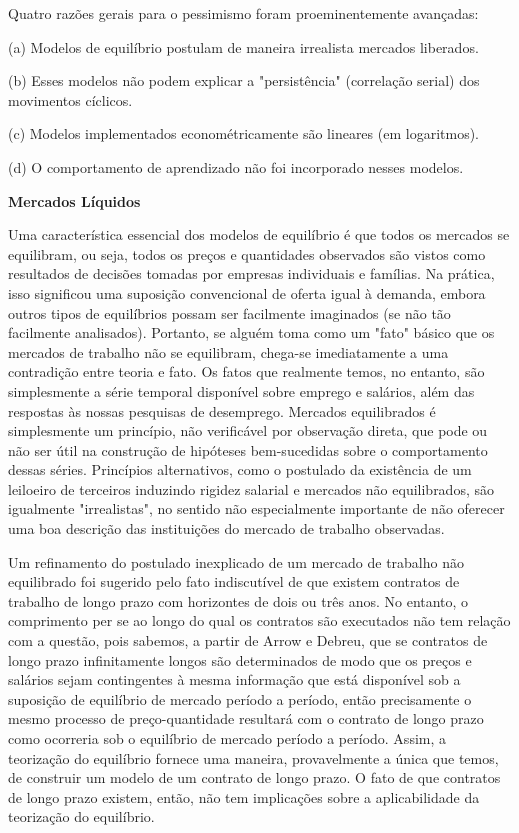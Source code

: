 \documentclass[12pt]{article}
\begin{document}
Quatro razões gerais para o pessimismo foram proeminentemente avançadas:

(a) Modelos de equilíbrio postulam de maneira irrealista mercados liberados.

(b) Esses modelos não podem explicar a "persistência" (correlação serial) dos movimentos cíclicos.

(c) Modelos implementados econométricamente são lineares (em logaritmos).

(d) O comportamento de aprendizado não foi incorporado nesses modelos.

\textbf{Mercados Líquidos}

Uma característica essencial dos modelos de equilíbrio é que todos os mercados se equilibram, ou seja, todos os preços e quantidades observados são vistos como resultados de decisões tomadas por empresas individuais e famílias. Na prática, isso significou uma suposição convencional de oferta igual à demanda, embora outros tipos de equilíbrios possam ser facilmente imaginados (se não tão facilmente analisados). Portanto, se alguém toma como um "fato" básico que os mercados de trabalho não se equilibram, chega-se imediatamente a uma contradição entre teoria e fato. Os fatos que realmente temos, no entanto, são simplesmente a série temporal disponível sobre emprego e salários, além das respostas às nossas pesquisas de desemprego. Mercados equilibrados é simplesmente um princípio, não verificável por observação direta, que pode ou não ser útil na construção de hipóteses bem-sucedidas sobre o comportamento dessas séries. Princípios alternativos, como o postulado da existência de um leiloeiro de terceiros induzindo rigidez salarial e mercados não equilibrados, são igualmente "irrealistas", no sentido não especialmente importante de não oferecer uma boa descrição das instituições do mercado de trabalho observadas.

Um refinamento do postulado inexplicado de um mercado de trabalho não equilibrado foi sugerido pelo fato indiscutível de que existem contratos de trabalho de longo prazo com horizontes de dois ou três anos. No entanto, o comprimento per se ao longo do qual os contratos são executados não tem relação com a questão, pois sabemos, a partir de Arrow e Debreu, que se contratos de longo prazo infinitamente longos são determinados de modo que os preços e salários sejam contingentes à mesma informação que está disponível sob a suposição de equilíbrio de mercado período a período, então precisamente o mesmo processo de preço-quantidade resultará com o contrato de longo prazo como ocorreria sob o equilíbrio de mercado período a período. Assim, a teorização do equilíbrio fornece uma maneira, provavelmente a única que temos, de construir um modelo de um contrato de longo prazo. O fato de que contratos de longo prazo existem, então, não tem implicações sobre a aplicabilidade da teorização do equilíbrio.
\end{document}
